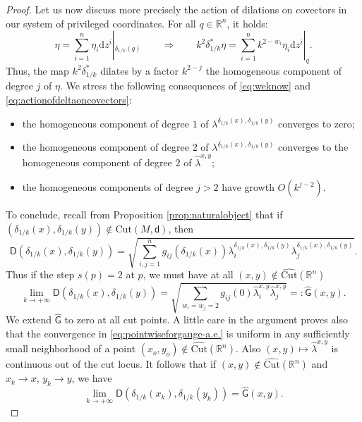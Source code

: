 \documentclass[11pt,a4paper]{article}
\theoremstyle{plain}
\theoremstyle{definition}
\theoremstyle{remark}
\numberwithin{equation}{section}
\newcommand{\R}{\mathbb{R}} %
\newcommand{\Cut}{\mathrm{Cut}}
\newcommand{\di}{\mathrm{d}}
\newcommand{\sfd}{\mathsf d}
\newcommand{\sfD}{\mathsf D}
\newcommand{\sfG}{\mathsf G}
\begin{document}
\begin{proof}
Let us now discuss more precisely the action of dilations on covectors in our system of privileged coordinates. For all $q\in \R^n$, it holds:
\begin{equation}\label{eq:actionofdeltaoncovectors}
\eta = \sum_{i=1}^n \eta_i \di z^i|_{\delta_{1/k}(q)} \qquad \Rightarrow \qquad k^2\delta_{1/k}^* \eta = \sum_{i=1}^n k^{2-w_i} \eta_i  \di z^i|_{q}.
\end{equation}
Thus, the map $k^2\delta_{1/k}^*$ dilates by a factor $k^{2-j}$ the homogeneous component of degree $j$ of $\eta$. We stress the following consequences of \eqref{eq:weknow} and \eqref{eq:actionofdeltaoncovectors}:
\begin{itemize}
\item the homogeneous component of degree $1$ of $\lambda^{\delta_{1/k}(x),\delta_{1/k}(y)}$ converges to zero;
\item the homogeneous component of degree $2$ of $\lambda^{\delta_{1/k}(x),\delta_{1/k}(y)}$ converges to the homogeneous component of degree $2$ of $\hat{\lambda}^{x,y}$;
\item the homogeneous components of degree $j>2$ have growth $O(k^{j-2})$.
\end{itemize}
To conclude, recall from Proposition \ref{prop:naturalobject} that if $(\delta_{1/k}(x),\delta_{1/k}(y))\notin\Cut(M,\sfd)$, then
\begin{equation}
\sfD(\delta_{1/k}(x),\delta_{1/k}(y)) = \sqrt{\sum_{i,j=1}^n g_{ij}(\delta_{1/k}(x))\lambda^{\delta_{1/k}(x),\delta_{1/k}(y)}_i \lambda^{\delta_{1/k}(x),\delta_{1/k}(y)}_j}.
\end{equation}
Thus if the step $s(p)=2$ at $p$, we must have at all $(x,y)\notin \widehat{\Cut}(\R^n)$
\begin{equation}\label{eq:pointwiseforgauge-a.e.}
\lim_{k\to +\infty} \sfD(\delta_{1/k}(x),\delta_{1/k}(y)) = \sqrt{\sum_{w_i=w_j=2} g_{ij}(0)\hat{\lambda}^{x,y}_i \hat{\lambda}^{x,y}_j} =:\hat{\sfG}(x,y).
\end{equation}
We extend $\hat{\sfG}$ to zero at all cut points. A little care in the argument proves also that the convergence in \eqref{eq:pointwiseforgauge-a.e.} is uniform in any sufficiently small neighborhood of a point $(x_o,y_o)\notin \widehat{\Cut}(\R^n)$. Also $(x,y)\mapsto \hat{\lambda}^{x,y}$ is continuous out of the cut locus. It follows that if $(x,y)\notin \widehat{\Cut}(\R^n)$ and $x_k\to x$, $y_k\to y$, we have
\begin{equation}\label{eq:pointwiseforgauge-a.e.2}
\lim_{k\to +\infty} \sfD(\delta_{1/k}(x_k),\delta_{1/k}(y_k)) =\hat{\sfG}(x,y).
\end{equation}


\end{proof}
\end{document}

